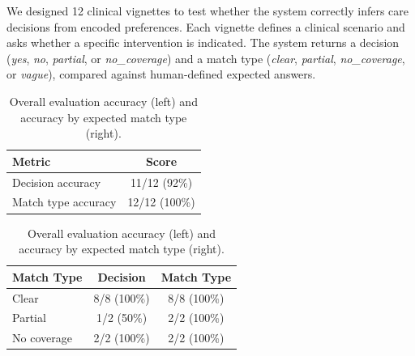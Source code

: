 \documentclass[11pt]{article}
\begin{document}
We designed 12 clinical vignettes to test whether the system correctly infers care decisions from encoded preferences. Each vignette defines a clinical scenario and asks whether a specific intervention is indicated. The system returns a decision (\textit{yes}, \textit{no}, \textit{partial}, or \textit{no\_coverage}) and a match type (\textit{clear}, \textit{partial}, \textit{no\_coverage}, or \textit{vague}), compared against human-defined expected answers.

\begin{table}[ht]
\centering
\caption{Overall evaluation accuracy (left) and accuracy by expected match type (right).}
\label{tab:summary}
\begin{tabular}{lc}
\toprule
\textbf{Metric} & \textbf{Score} \\
\midrule
Decision accuracy & 11/12 (92\%) \\
Match type accuracy & 12/12 (100\%) \\
\bottomrule
\end{tabular}
\hspace{1.5em}
\begin{tabular}{lcc}
\toprule
\textbf{Match Type} & \textbf{Decision} & \textbf{Match Type} \\
\midrule
Clear & 8/8 (100\%) & 8/8 (100\%) \\
Partial & 1/2 (50\%) & 2/2 (100\%) \\
No coverage & 2/2 (100\%) & 2/2 (100\%) \\
\bottomrule
\end{tabular}
\end{table}
\end{document}
